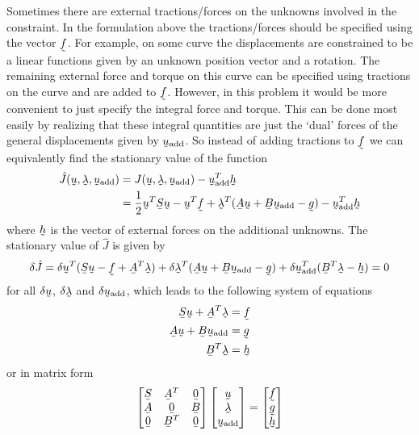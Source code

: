 Sometimes there are external tractions/forces on the unknowns involved in the
constraint. In the formulation above the tractions/forces should be specified 
using the vector $\col f$. 
For example, on some curve the displacements are constrained to
be a linear functions given by an unknown position vector and a rotation. The
remaining external force and torque on this curve can be specified using
tractions on the curve and are added to $\col f$. However, in this problem it
would be more convenient to just specify the integral force and torque. This
can be done most easily by realizing that these integral quantities are just
the `dual' forces of the general displacements given by $\col u_\text{add}$. So
instead of adding tractions to $\col f$ we can equivalently find the
stationary value of the function
\[
  \begin{split}
   \hat{J}(\col u,\col\lambda,\col u_\text{add})&= 
        J(\col u,\col\lambda,\col u_\text{add})-\col u^T_\text{add}\col h \\
        &=\frac 12\col u^T\mat S\col u-\col u^T\col f
    +\col\lambda^T ( \mat A \col u + \mat B \col u_\text{add}-\col g )
                                               -\col u^T_\text{add}\col h
  \end{split}
\]
where $\col h$ is the vector of external forces on the additional unknowns.
The stationary value of $\hat J$ is given by
\[
   \delta \hat{J} = \delta \col u^T(\mat S\col u -\col f +\mat A^T\col\lambda)
  + \delta\col\lambda^T(\mat A\col u+\mat B\col u_\text{add}-\col g)
  + \delta\col u^T_\text{add}(\mat B^T\col\lambda-\col h) = 0
\]
for all $\delta\col u$, $\delta\col\lambda$ and $\delta\col u_\text{add}$,
which leads to the following system of equations
\begin{align*}
   \mat S\col u +\mat A^T\col\lambda &=\col f \\
\mat A\col u+\mat B\col u_\text{add}&=\col g\\
\mat B^T\col\lambda&=\col h
\end{align*}
or in matrix form
\begin{equation}
  \begin{bmatrix}
     \mat S & \mat A^T & \mat 0 \\
     \mat A & \mat 0 & \mat B   \\
     \mat 0 & \mat B^T & \mat 0
  \end{bmatrix}
  \begin{bmatrix}
     \col u \\
     \col\lambda \\
     \col u_\text{add}
  \end{bmatrix}
=
  \begin{bmatrix}
     \col f \\
     \col g \\
     \col h
  \end{bmatrix}
\label{eq:constraintsystem}
\end{equation}
